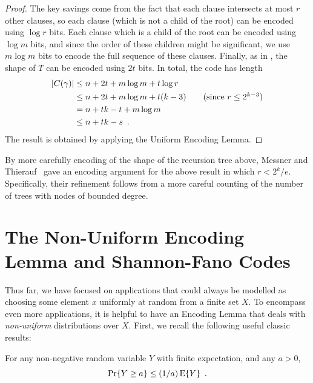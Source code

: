 \documentclass[prodmode,acmcsur]{acmsmall}
\begin{document}
\begin{proof}
  The key savings come from the fact that each clause intersects at
  most $r$ other clauses, so each clause (which is not a child of the
  root) can be encoded using $\log r$ bits. Each clause which is a
  child of the root can be encoded using $\log m$ bits, and since the
  order of these children might be significant, we use $m \log m$ bits
  to encode the full sequence of these clauses. Finally, as in
  , the shape of $T$ can be encoded
  using $2t$ bits. In total, the code has length
  \begin{align*}
    |C(\gamma)| &\le n + 2t + m\log m+ t \log r \\
    &\le n + 2t + m\log m + t(k - 3) \tag{since $r \le 2^{k - 3}$} \\
    &= n + tk - t + m\log m \\
    &\le n + tk - s \enspace .
  \end{align*}
  The result is obtained by applying the Uniform Encoding Lemma.
\end{proof}

\begin{rem}
  By more carefully encoding of the shape of the recursion tree above,
  Messner and Thierauf~\cite{messner:ksat} gave an encoding argument
  for the above result in which $r < 2^k/e$. Specifically, their 
  refinement follows
  from a more careful counting of the number of trees with nodes of
  bounded degree.
\end{rem}

\section{The Non-Uniform Encoding Lemma and Shannon-Fano Codes}

Thus far, we have focused on applications that could always be
modelled as choosing some element $x$ uniformly at random from a
finite set $X$. To encompass even more applications, it is helpful to
have an Encoding Lemma that deals with \emph{non-uniform}
distributions over $X$. First, we recall the following useful classic
results: 
\begin{thm}
  For any non-negative random variable $Y$ with finite
  expectation, and any $a > 0$,
  \[
    \Pr\{Y \geq a\} \leq (1/a) \operatorname{\mathrm{E}}\{Y\} \enspace .
  \]
\end{thm}
\end{document}
